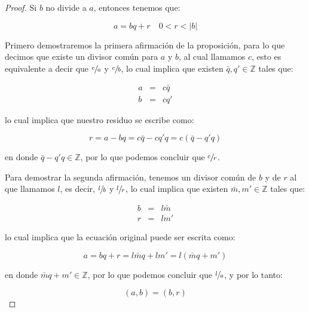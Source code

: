         \begin{proof}
            Si $b$ no divide a $a$, entonces tenemos que:

            \begin{equation*}
                a = bq + r \quad 0 < r < |b|
            \end{equation*}

            Primero demostraremos la primera afirmación de la proposición, para lo que decimos que existe un divisor común para $a$ y $b$, al cual llamamos $c$, esto es equivalente a decir que $\sfrac{c}{a}$ y $\sfrac{c}{b}$, lo cual implica que existen $\bar{q}, q' \in \mathbb{Z}$ tales que:

            \begin{eqnarray*}
                a & = & c \bar{q} \\
                b & = & c q'
            \end{eqnarray*}

            lo cual implica que nuestro residuo se escribe como:

            \begin{equation*}
                r = a - bq = c \bar{q} - c q' q = c (\bar{q} - q' q)
            \end{equation*}

            en donde $\bar{q} - q' q \in \mathbb{Z}$, por lo que podemos concluir que $\sfrac{c}{r}$.

            Para demostrar la segunda afirmación, tenemos un divisor común de $b$ y de $r$ al que llamamos $l$, es decir, $\sfrac{l}{b}$ y $\sfrac{l}{r}$, lo cual implica que existen $\bar{m}, m' \in \mathbb{Z}$ tales que:

            \begin{eqnarray*}
                b & = & l \bar{m} \\
                r & = & l m'
            \end{eqnarray*}

            lo cual implica que la ecuación original puede ser escrita como:

            \begin{equation*}
                a = bq + r = l \bar{m} q + lm' = l (\bar{m}q  + m')
            \end{equation*}

            en donde $\bar{m}q  + m' \in \mathbb{Z}$, por lo que podemos concluir que $\sfrac{l}{a}$, y por lo tanto:

            \begin{equation*}
                (a, b) = (b, r)
            \end{equation*}
        \end{proof}

